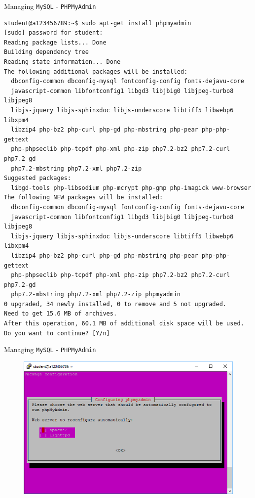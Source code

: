 \documentclass[xcolor=table]{beamer}
\begin{document}
\begin{frame}[fragile]{Managing \texttt{MySQL} - \texttt{PHPMyAdmin}}
  \begin{tcolorbox}
    \lstset{
      basicstyle=\Tiny\ttfamily,
    }
    \begin{lstlisting}
student@a123456789:~$ sudo apt-get install phpmyadmin
[sudo] password for student:
Reading package lists... Done
Building dependency tree
Reading state information... Done
The following additional packages will be installed:
  dbconfig-common dbconfig-mysql fontconfig-config fonts-dejavu-core
  javascript-common libfontconfig1 libgd3 libjbig0 libjpeg-turbo8 libjpeg8
  libjs-jquery libjs-sphinxdoc libjs-underscore libtiff5 libwebp6 libxpm4
  libzip4 php-bz2 php-curl php-gd php-mbstring php-pear php-php-gettext
  php-phpseclib php-tcpdf php-xml php-zip php7.2-bz2 php7.2-curl php7.2-gd
  php7.2-mbstring php7.2-xml php7.2-zip
Suggested packages:
  libgd-tools php-libsodium php-mcrypt php-gmp php-imagick www-browser
The following NEW packages will be installed:
  dbconfig-common dbconfig-mysql fontconfig-config fonts-dejavu-core
  javascript-common libfontconfig1 libgd3 libjbig0 libjpeg-turbo8 libjpeg8
  libjs-jquery libjs-sphinxdoc libjs-underscore libtiff5 libwebp6 libxpm4
  libzip4 php-bz2 php-curl php-gd php-mbstring php-pear php-php-gettext
  php-phpseclib php-tcpdf php-xml php-zip php7.2-bz2 php7.2-curl php7.2-gd
  php7.2-mbstring php7.2-xml php7.2-zip phpmyadmin
0 upgraded, 34 newly installed, 0 to remove and 5 not upgraded.
Need to get 15.6 MB of archives.
After this operation, 60.1 MB of additional disk space will be used.
Do you want to continue? [Y/n]
    \end{lstlisting}
  \end{tcolorbox}
\end{frame}

\begin{frame}{Managing \texttt{MySQL} - \texttt{PHPMyAdmin}}
  \begin{figure}
    \begin{center}
      \includegraphics[width=1\linewidth]{MySQLInstall1.png}
    \end{center}
  \end{figure}
\end{frame}
\end{document}
